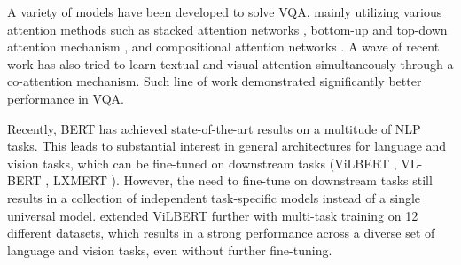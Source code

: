 \documentclass{article}
\begin{document}

A variety of models have been developed to solve VQA, mainly utilizing various attention methods such as stacked attention networks \citep{yang2016vqa}, bottom-up and top-down attention mechanism \citep{Anderson_2018_CVPR}, and compositional attention networks \citep{hudson2018mac}. A wave of recent work has also tried to learn textual and visual attention simultaneously through a co-attention mechanism. Such line of work \citep{yu2019mcan, Nguyen_2018_CVPR} demonstrated significantly better performance in VQA. 

Recently, BERT \citep{devlin-etal-2019-bert} has achieved state-of-the-art results on a multitude of NLP tasks. This leads to substantial interest in general architectures for language and vision tasks, which can be fine-tuned on downstream tasks (ViLBERT \citep{lu2019vilbert}, VL-BERT \citep{Su2020VL-BERT}, LXMERT \citep{tan2019lxmert}). However, the need to fine-tune on downstream tasks still results in a collection of independent task-specific models instead of a single universal model. \citet{lu2020multitask} extended ViLBERT further with multi-task training on 12 different datasets, which results in a strong performance across a diverse set of language and vision tasks, even without further fine-tuning.
\end{document}
